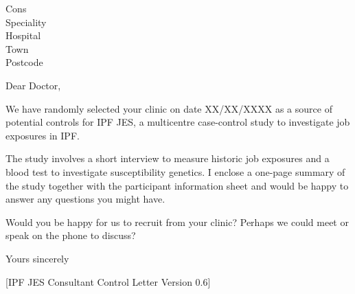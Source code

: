 \documentclass[ipfjes-centre,letterpaper,pagesize,UScommercial9]{scrlttr2}
\begin{document}
\begin{letter}{Cons \\ Speciality \\ Hospital \\ Town \\ Postcode}


\opening{Dear Doctor,}

    We have randomly selected your clinic on date XX/XX/XXXX as a source of potential controls for IPF JES, a multicentre case-control study to investigate job exposures in IPF.
    
    The study involves a short interview to measure historic job exposures and a blood test to investigate susceptibility genetics. I enclose a one-page summary of the study together with the participant information sheet and would be happy to answer any questions you might have.
    
    Would you be happy for us to recruit from your clinic? Perhaps we could meet or speak on the phone to discuss?


\closing{Yours sincerely}

     \vfill \hfill [IPF JES Consultant Control Letter Version 0.6]

\end{letter}
\end{document}
